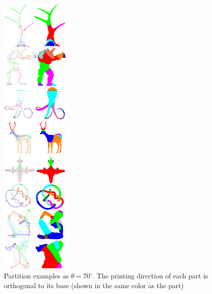 \begin{figure}[t]
  \centering
  \includegraphics[width=0.3\textwidth]{figs/programming.png}
  \caption{\label{fig:programming}%
           Partition examples as $\theta = 70^{\circ}$. The printing direction of each part is orthogonal to its base (shown in the same color as the part)}
\end{figure}

